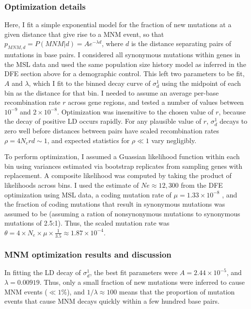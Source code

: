 \documentclass[]{article}
\begin{document}
\subsubsection{Optimization details}

Here, I fit a simple exponential model for the fraction of new mutations at a
given distance that give rise to a MNM event, so that \(p_{MNM,d} = P(MNM | d)
= Ae^{-\lambda d}\), where \(d\) is the distance separating pairs of mutations
in base pairs. I considered all synonymous mutations within genes in the MSL
data and used the same population size history model as inferred in the DFE
section above for a demographic control. This left two parameters to be fit,
\(A\) and \(\lambda\), which I fit to the binned decay curve of \(\sigma_d^1\)
using the midpoint of each bin as the distance for that bin. I needed to assume
an average per-base recombination rate \(r\) across gene regions, and tested a
number of values between \(10^{-9}\) and \(2\times 10^{-8}\). Optimization was
insensitive to the chosen value of \(r\), because the decay of positive LD
occurs rapidly. For any plausible value of \(r\), \(\sigma_d^1\) decays to zero
well before distances between pairs have scaled recombination rates \(\rho=4
N_e r d \sim 1\), and expected statistics for \(\rho \ll 1\) vary negligibly.

To perform optimization, I assumed a Guassian likelihood function within each
bin using variances estimated via bootstrap replicates from sampling genes with
replacement. A composite likelihood was computed by taking the product of
likelihoods across bins. I used the estimate of \(Ne\approx12,300\) from the
DFE optimization using MSL data, a coding mutation rate of
\(\mu=1.33\times10^{-8}\) \citep{Karczewski2020-le}, and the fraction of coding
mutations that result in synonymous mutations was assumed to be (assuming a
ration of nonsynonymous mutations to synonymous mutations of 2.5:1). Thus, the
scaled mutation rate was \(\theta=4\times
N_e\times\mu\times\frac{1}{3.5}\approx1.87\times10^{-4}\).

\subsubsection{MNM optimization results and discussion}

In fitting the LD decay of \(\sigma_d^1\), the best fit parameters were
\(A=2.44\times10^{-5}\), and \(\lambda=0.00919\). Thus, only a small fraction
of new mutations were inferred to cause MNM events (\(\ll1\%\)), and
\(1/\lambda\approx 100\) means that the proportion of mutation events that
cause MNM decays quickly within a few hundred base pairs.
\end{document}
